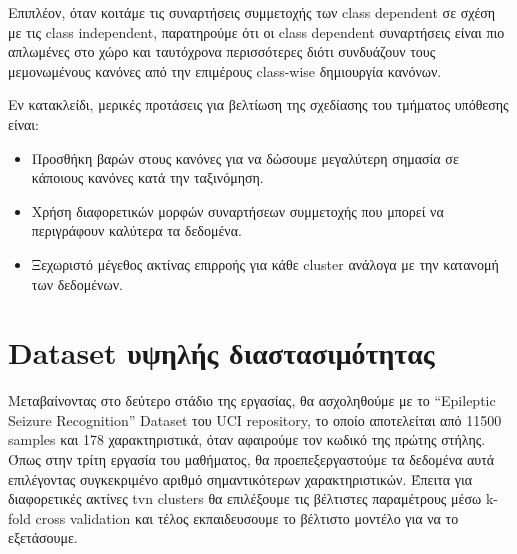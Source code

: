 \documentclass[12pt]{report}
\begin{document}
Επιπλέον, όταν κοιτάμε τις συναρτήσεις συμμετοχής των class dependent σε σχέση με τις class independent, παρατηρούμε ότι οι class dependent συναρτήσεις είναι πιο απλωμένες στο χώρο και ταυτόχρονα περισσότερες διότι συνδυάζουν τους μεμονωμένους κανόνες από την επιμέρους class-wise δημιουργία κανόνων.

Εν κατακλείδι, μερικές προτάσεις για βελτίωση της σχεδίασης του τμήματος υπόθεσης είναι:
\begin{itemize}
    \item Προσθήκη βαρών στους κανόνες για να δώσουμε μεγαλύτερη σημασία σε κάποιους κανόνες κατά την ταξινόμηση.
    \item Χρήση διαφορετικών μορφών συναρτήσεων συμμετοχής που μπορεί να περιγράφουν καλύτερα τα δεδομένα.
    \item Ξεχωριστό μέγεθος ακτίνας επιρροής για κάθε cluster ανάλογα με την κατανομή των δεδομένων. 
\end{itemize}


\section{Dataset υψηλής διαστασιμότητας}
Μεταβαίνοντας στο δεύτερο στάδιο της εργασίας, θα ασχοληθούμε με το ``Epileptic Seizure Recognition'' Dataset του UCI repository, το οποίο αποτελείται από 11500 samples και 178 χαρακτηριστικά, όταν αφαιρούμε τον κωδικό της πρώτης στήλης. Όπως στην τρίτη εργασία του μαθήματος, θα προεπεξεργαστούμε τα δεδομένα αυτά επιλέγοντας συγκεκριμένο αριθμό σημαντικότερων χαρακτηριστικών. Έπειτα για διαφορετικές ακτίνες tvn clusters θα επιλέξουμε τις βέλτιστες παραμέτρους μέσω k-fold cross validation και τέλος εκπαιδευσουμε το βέλτιστο μοντέλο για να το εξετάσουμε.
\end{document}
